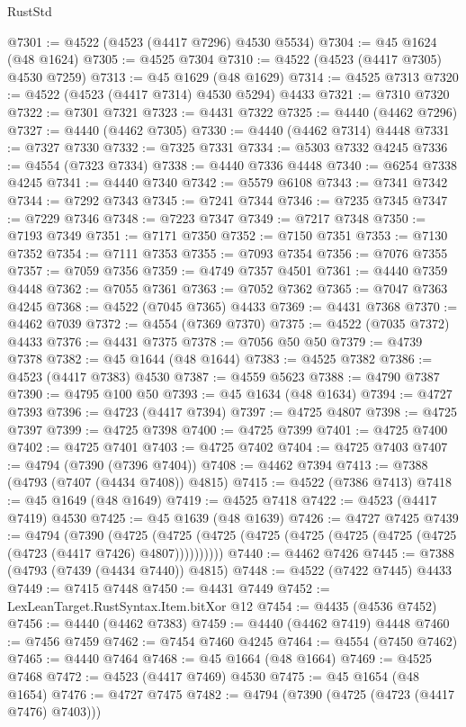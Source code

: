 \begin{lexlean}{RustStd}
\begin{coremodule}
{\begin{coremodule}
{{{{{{{{{{{{{{{{{{{{{{{{{{{{{{{{{{{{{{{{{{{{{{{{{{{{{{{{{{{{@7301 := @4522 (@4523 (@4417 @7296) @4530 @5534)
@7304 := @45 @1624 (@48 @1624)
@7305 := @4525 @7304
@7310 := @4522 (@4523 (@4417 @7305) @4530 @7259)
@7313 := @45 @1629 (@48 @1629)
@7314 := @4525 @7313
@7320 := @4522 (@4523 (@4417 @7314) @4530 @5294) @4433
@7321 := @7310 @7320
@7322 := @7301 @7321
@7323 := @4431 @7322
@7325 := @4440 (@4462 @7296)
@7327 := @4440 (@4462 @7305)
@7330 := @4440 (@4462 @7314) @4448
@7331 := @7327 @7330
@7332 := @7325 @7331
@7334 := @5303 @7332 @4245
@7336 := @4554 (@7323 @7334)
@7338 := @4440 @7336 @4448
@7340 := @6254 @7338 @4245
@7341 := @4440 @7340
@7342 := @5579 @6108
@7343 := @7341 @7342
@7344 := @7292 @7343
@7345 := @7241 @7344
@7346 := @7235 @7345
@7347 := @7229 @7346
@7348 := @7223 @7347
@7349 := @7217 @7348
@7350 := @7193 @7349
@7351 := @7171 @7350
@7352 := @7150 @7351
@7353 := @7130 @7352
@7354 := @7111 @7353
@7355 := @7093 @7354
@7356 := @7076 @7355
@7357 := @7059 @7356
@7359 := @4749 @7357 @4501
@7361 := @4440 @7359 @4448
@7362 := @7055 @7361
@7363 := @7052 @7362
@7365 := @7047 @7363 @4245
@7368 := @4522 (@7045 @7365) @4433
@7369 := @4431 @7368
@7370 := @4462 @7039
@7372 := @4554 (@7369 @7370)
@7375 := @4522 (@7035 @7372) @4433
@7376 := @4431 @7375
@7378 := @7056 @50 @50
@7379 := @4739 @7378
@7382 := @45 @1644 (@48 @1644)
@7383 := @4525 @7382
@7386 := @4523 (@4417 @7383) @4530
@7387 := @4559 @5623
@7388 := @4790 @7387
@7390 := @4795 @100 @50
@7393 := @45 @1634 (@48 @1634)
@7394 := @4727 @7393
@7396 := @4723 (@4417 @7394)
@7397 := @4725 @4807
@7398 := @4725 @7397
@7399 := @4725 @7398
@7400 := @4725 @7399
@7401 := @4725 @7400
@7402 := @4725 @7401
@7403 := @4725 @7402
@7404 := @4725 @7403
@7407 := @4794 (@7390 (@7396 @7404))
@7408 := @4462 @7394
@7413 := @7388 (@4793 (@7407 (@4434 @7408)) @4815)
@7415 := @4522 (@7386 @7413)
@7418 := @45 @1649 (@48 @1649)
@7419 := @4525 @7418
@7422 := @4523 (@4417 @7419) @4530
@7425 := @45 @1639 (@48 @1639)
@7426 := @4727 @7425
@7439 := @4794
    (@7390
      (@4725 (@4725 (@4725 (@4725 (@4725 (@4725 (@4725 (@4725 (@4723 (@4417 @7426) @4807))))))))))
@7440 := @4462 @7426
@7445 := @7388 (@4793 (@7439 (@4434 @7440)) @4815)
@7448 := @4522 (@7422 @7445) @4433
@7449 := @7415 @7448
@7450 := @4431 @7449
@7452 := LexLeanTarget.RustSyntax.Item.bitXor @12
@7454 := @4435 (@4536 @7452)
@7456 := @4440 (@4462 @7383)
@7459 := @4440 (@4462 @7419) @4448
@7460 := @7456 @7459
@7462 := @7454 @7460 @4245
@7464 := @4554 (@7450 @7462)
@7465 := @4440 @7464
@7468 := @45 @1664 (@48 @1664)
@7469 := @4525 @7468
@7472 := @4523 (@4417 @7469) @4530
@7475 := @45 @1654 (@48 @1654)
@7476 := @4727 @7475
@7482 := @4794 (@7390 (@4725 (@4723 (@4417 @7476) @7403)))
}}}}}}}}}}}}}}}}}}}}}}}}}}}}}}}}}}}}}}}}}}}}}}}}}}}}}}}}}}}}
\end{coremodule}}
\end{coremodule}
\end{lexlean}
